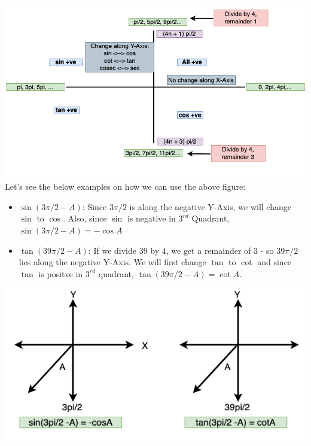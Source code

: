 \documentclass{book}
\begin{document}
	\includegraphics[scale=0.5]{reduction} \\
	
	Let's see the below examples on how we can use the above figure: \\
	
	\begin{itemize}
		\item $\sin(3\pi/2 - A)$: Since $3\pi/2$ is along the  negative Y-Axis, we will change $\sin$ to $\cos$. Also, since $\sin$ is negative in $3^{rd}$ Quadrant, $\sin(3\pi/2 - A) = -\cos{A}$ 
		\item $\tan(39\pi/2 - A)$:  If we divide $39$ by $4$, we get a remainder of $3$ - so $39\pi/2$ lies along the negative Y-Axis. We will first change $\tan$ to $\cot$ and since $\tan$ is positve in $3^{rd}$ quadrant, $\tan(39\pi/2 - A) = \cot{A}$. 
	\end{itemize}
	
	\includegraphics[scale=0.5]{reductionex}
	
	
	
\end{document}
